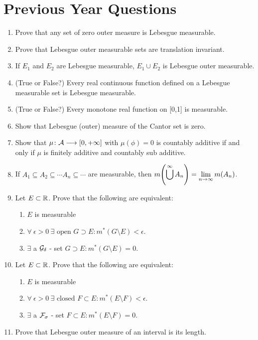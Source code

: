 \documentclass[a4paper]{book}
\begin{document}
\section{Previous Year Questions}
\begin{enumerate}
\item Prove that any set of zero outer measure is Lebesgue measurable.
\item Prove that Lebesgue outer measurable sets are translation invariant.
\item If $E_1$ and $E_2$ are Lebesgue measurable, $E_1 \cup E_2$ is Lebesgue outer measurable.
\item (True or False?) Every real continuous function defined on a Lebesgue measurable set is Lebesgue measurable.
\item (True or False?) Every monotone real function on [0,1] is measurable.
\item Show that Lebesgue (outer) measure of the Cantor set is zero.
\item Show that $\mu\colon \mathcal{A} \longrightarrow [0,+\infty]$ with $\mu(\phi)=0$ is countably additive if and only if $\mu$ is finitely additive and countably sub additive.
\item If $A_1 \subseteq A_2 \subseteq \cdots A_n \subseteq \cdots$ are measurable, then $\displaystyle m\qty(\bigcup^\infty A_n) = \lim_{n \to \infty} m(A_n)$.
\item Let $E \subset \mathbb{R}$. Prove that the following are equivalent:
\begin{enumerate}
\item $E$ is measurable
\item $\forall\ \epsilon>0\ \exists \text{ open } G \supset E : m^*(G \setminus E) <  \epsilon$.
\item $\exists$ a $\mathcal{G}_\delta$ - set $G \supset E : m^*(G \setminus E) = 0$. 
\end{enumerate}
\item Let $E \subset \mathbb{R}$. Prove that the following are equivalent:
\begin{enumerate}
\item $E$ is measurable
\item $\forall\ \epsilon>0\ \exists \text{ closed } F \subset E : m^*(E \setminus F) <  \epsilon$.
\item $\exists$ a $\mathcal{F}_\sigma$ - set $F \subset E : m^*(E \setminus F) = 0$. 
\end{enumerate}
\item Prove that Lebesgue outer measure of an interval is its length.

\end{enumerate}
\end{document}
